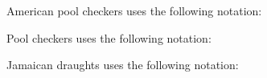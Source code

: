 \documentclass[letterpaper,10pt,english]{sphinxmanual}
\begin{document}
\sphinxAtStartPar
American pool checkers uses the following notation:
\begin{quote}

\noindent{}
\end{quote}

\sphinxAtStartPar
Pool checkers uses the following notation:
\begin{quote}

\noindent{}
\end{quote}

\sphinxAtStartPar
Jamaican draughts uses the following notation:
\begin{quote}

\noindent{}
\end{quote}

\sphinxstepscope
\end{document}
